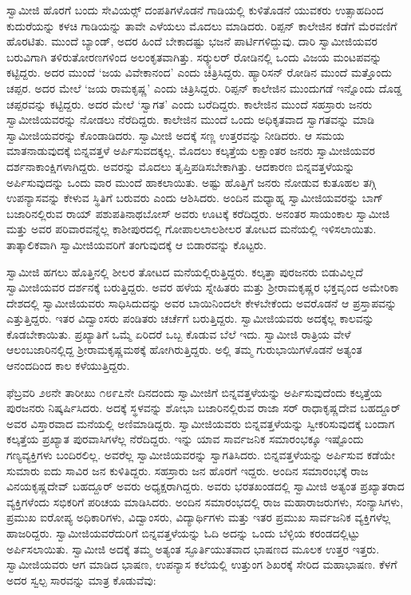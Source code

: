 \vskip 3pt

 ಸ್ವಾಮೀಜಿ ಹೊರಗೆ ಬಂದು ಸೇವಿಯರ್ಸ್‍‍ ದಂಪತಿಗಳೊಡನೆ ಗಾಡಿಯಲ್ಲಿ ಕುಳಿತೊಡನೆ ಯುವಕರು ಉತ್ಸಾಹದಿಂದ ಕುದುರೆಯನ್ನು ಕಳಚಿ ಗಾಡಿಯನ್ನು ತಾವೇ ಎಳೆಯಲು ಮೊದಲು ಮಾಡಿದರು. ರಿಪ್ಪನ್ ಕಾಲೇಜಿನ ಕಡೆಗೆ ಮೆರವಣಿಗೆ ಹೊರಟಿತು. ಮುಂದೆ ಬ್ಯಾಂಡ್, ಅದರ ಹಿಂದೆ ಬೇಕಾದಷ್ಟು ಭಜನೆ ಪಾರ್ಟಿಗಳಿದ್ದುವು. ದಾರಿ ಸ್ವಾಮೀಜಿಯವರ ಬರುವಿಗಾಗಿ ತಳಿರುತೋರಣಗಳಿಂದ ಅಲಂಕೃತವಾಗಿತ್ತು. ಸರ್‍ಕ್ಯುಲರ್ ರೋಡಿನಲ್ಲಿ ಒಂದು ವಿಜಯ ಮಂಟಪವನ್ನು ಕಟ್ಟಿದ್ದರು. ಅದರ ಮುಂದೆ ‘ಜಯ ವಿವೇಕಾನಂದ’ ಎಂದು ಚಿತ್ರಿಸಿದ್ದರು. ಹ್ಯಾರಿಸನ್ ರೋಡಿನ ಮುಂದೆ ಮತ್ತೊಂದು ಚಪ್ಪರ. ಅದರ ಮೇಲೆ ‘ಜಯ ರಾಮಕೃಷ್ಣ’ ಎಂದು ಚಿತ್ರಿಸಿದ್ದರು. ರಿಪ್ಪನ್ ಕಾಲೇಜಿನ ಮುಂದುಗಡೆ ಇನ್ನೊಂದು ದೊಡ್ಡ ಚಪ್ಪರವನ್ನು ಕಟ್ಟಿದ್ದರು. ಅದರ ಮೇಲೆ ‘ಸ್ವಾಗತ’ ಎಂದು ಬರೆದಿದ್ದರು. ಕಾಲೇಜಿನ ಮುಂದೆ ಸಹಸ್ರಾರು ಜನರು ಸ್ವಾಮೀಜಿಯವರನ್ನು ನೋಡಲು ನೆರೆದಿದ್ದರು. ಕಾಲೇಜಿನ ಮುಂದೆ ಒಂದು ಅಧಿಕೃತವಾದ ಸ್ವಾಗತವನ್ನು ಮಾಡಿ ಸ್ವಾಮೀಜಿಯವರನ್ನು ಕೊಂಡಾಡಿದರು. ಸ್ವಾಮೀಜಿ ಅದಕ್ಕೆ ಸಣ್ಣ ಉತ್ತರವನ್ನು ನೀಡಿದರು. ಆ ಸಮಯ ಮಾತನಾಡುವುದಕ್ಕೆ ಬಿನ್ನವತ್ತಳೆ ಅರ್ಪಿಸುವದಕ್ಕಲ್ಲ. ಮೊದಲು ಕಲ್ಕತ್ತೆಯ ಲಕ್ಷಾಂತರ ಜನರು ಸ್ವಾಮೀಜಿಯವರ ದರ್ಶನಾಕಾಂಕ್ಷಿಗಳಾಗಿದ್ದರು. ಅವರನ್ನು ಮೊದಲು ತೃಪ್ತಿಪಡಿಸಬೇಕಾಗಿತ್ತು. ಆದಕಾರಣ ಬಿನ್ನವತ್ತಳೆಯನ್ನು ಅರ್ಪಿಸುವುದನ್ನು ಒಂದು ವಾರ ಮುಂದೆ ಹಾಕಲಾಯಿತು. ಅಷ್ಟು ಹೊತ್ತಿಗೆ ಜನರು ನೋಡುವ ಕುತೂಹಲ ತಗ್ಗಿ ಉಪನ್ಯಾಸವನ್ನು ಕೇಳುವ ಸ್ಥಿತಿಗೆ ಬರುವರು ಎಂದು ಆಶಿಸಿದರು. ಅಂದಿನ ಮಧ್ಯಾಹ್ನ ಸ್ವಾಮೀಜಿಯವರನ್ನು ಬಾಗ್ ಬಜಾರಿನಲ್ಲಿರುವ ರಾಯ್ ಪಶುಪತಿನಾಥಬೋಸ್ ಅವರು ಊಟಕ್ಕೆ ಕರೆದಿದ್ದರು. ಅನಂತರ ಸಾಯಂಕಾಲ ಸ್ವಾಮೀಜಿ ಮತ್ತು ಅವರ ಪರಿವಾರವನ್ನೆಲ್ಲ ಕಾಶೀಪುರದಲ್ಲಿ ಗೋಪಾಲಲಾಲಶೀಲರ ತೋಟದ ಮನೆಯಲ್ಲಿ ಇಳಿಸಲಾಯಿತು. ತಾತ್ಕಾಲಿಕವಾಗಿ ಸ್ವಾಮೀಜಿಯವರಿಗೆ ತಂಗುವುದಕ್ಕೆ ಆ ಬಿಡಾರವನ್ನು ಕೊಟ್ಟರು. 

 ಸ್ವಾಮೀಜಿ ಹಗಲು ಹೊತ್ತಿನಲ್ಲಿ ಶೀಲರ ತೋಟದ ಮನೆಯಲ್ಲಿರುತ್ತಿದ್ದರು. ಕಲ್ಕತ್ತಾ ಪುರಜನರು ಬಿಡುವಿಲ್ಲದೆ ಸ್ವಾಮೀಜಿಯವರ ದರ್ಶನಕ್ಕೆ ಬರುತ್ತಿದ್ದರು. ಅವರ ಹಳೆಯ ಸ್ನೇಹಿತರು ಮತ್ತು ಶ‍್ರೀರಾಮಕೃಷ್ಣರ ಭಕ್ತವೃಂದ ಅಮೇರಿಕಾ ದೇಶದಲ್ಲಿ ಸ್ವಾಮೀಜಿಯವರು ಸಾಧಿಸಿದುದನ್ನು ಅವರ ಬಾಯಿನಿಂದಲೇ ಕೇಳಬೇಕೆಂದು ಅವರೊಡನೆ ಆ ಪ್ರಸ್ತಾಪವನ್ನು ಎತ್ತುತ್ತಿದ್ದರು. ಇತರ ವಿದ್ವಾಂಸರು ಪಂಡಿತರು ಚರ್ಚೆಗೆ ಬರುತ್ತಿದ್ದರು. ಸ್ವಾಮೀಜಿಯವರು ಅದಕ್ಕೆಲ್ಲ ಕಾಲವನ್ನು ಕೊಡಬೇಕಾಯಿತು. ಪ್ರಖ್ಯಾತಿಗೆ ಒಮ್ಮೆ ಏರಿದರೆ ಒಬ್ಬ ಕೊಡುವ ಬೆಲೆ ಇದು. ಸ್ವಾಮೀಜಿ ರಾತ್ರಿಯ ವೇಳೆ ಆಲಂಬಜಾರಿನಲ್ಲಿದ್ದ ಶ‍್ರೀರಾಮಕೃಷ್ಣಮಠಕ್ಕೆ ಹೋಗಿರುತ್ತಿದ್ದರು. ಅಲ್ಲಿ ತಮ್ಮ ಗುರುಭಾಯಿಗಳೊಡನೆ ಅತ್ಯಂತ ಆನಂದದಿಂದ ಕಾಲ ಕಳೆಯುತ್ತಿದ್ದರು. 

 ಫೆಬ್ರವರಿ ೨೮ನೇ ತಾರೀಖು ೧೮೯೭ನೇ ದಿನದಂದು ಸ್ವಾಮೀಜಿಗೆ ಬಿನ್ನವತ್ತಳೆಯನ್ನು ಅರ್ಪಿಸುವುದೆಂದು ಕಲ್ಕತ್ತೆಯ ಪುರಜನರು ನಿಷ್ಕರ್ಷಿಸಿದರು. ಅದಕ್ಕೆ ಸ್ಥಳವನ್ನು ಶೋಭಾ ಬಜಾರಿನಲ್ಲಿರುವ ರಾಜಾ ಸರ್ ರಾಧಾಕೃಷ್ಣದೇವ ಬಹದ್ದೂರ್ ಅವರ ವಿಸ್ತಾರವಾದ ಮನೆಯಲ್ಲಿ ಅಣಿಮಾಡಿದ್ದರು. ಸ್ವಾಮೀಜಿಯವರು ಬಿನ್ನವತ್ತಳೆಯನ್ನು ಸ್ವೀಕರಿಸುವುದಕ್ಕೆ ಬಂದಾಗ ಕಲ್ಕತ್ತೆಯ ಪ್ರಖ್ಯಾತ ಪುರವಾಸಿಗಳೆಲ್ಲ ನೆರೆದಿದ್ದರು. ಇನ್ನು ಯಾವ ಸಾರ್ವಜನಿಕ ಸಮಾರಂಭಕ್ಕೂ ಇಷ್ಟೊಂದು ಗಣ್ಯವ್ಯಕ್ತಿಗಳು ಬಂದಿರಲಿಲ್ಲ. ಅವರೆಲ್ಲ ಸ್ವಾಮೀಜಿಯವರನ್ನು ಸ್ವಾಗತಿಸಿದರು. ಬಿನ್ನವತ್ತಳೆಯನ್ನು ಅರ್ಪಿಸುವ ಕಡೆಯೇ ಸುಮಾರು ಐದು ಸಾವಿರ ಜನ ಕುಳಿತಿದ್ದರು. ಸಹಸ್ರಾರು ಜನ ಹೊರಗೆ ಇದ್ದರು. ಅಂದಿನ ಸಮಾರಂಭಕ್ಕೆ ರಾಜ ವಿನಯಕೃಷ್ಣದೇವ್ ಬಹದ್ದೂರ್ ಅವರು ಅಧ್ಯಕ್ಷರಾಗಿದ್ದರು. ಅವರು ಭರತಖಂಡದಲ್ಲಿ ಸ್ವಾಮೀಜಿ ಅತ್ಯಂತ ಪ್ರಖ್ಯಾತರಾದ ವ್ಯಕ್ತಿಗಳೆಂದು ಸಭಿಕರಿಗೆ ಪರಿಚಯ ಮಾಡಿಸಿದರು. ಅಂದಿನ ಸಮಾರಂಭದಲ್ಲಿ ರಾಜ ಮಹಾರಾಜರುಗಳು, ಸಂನ್ಯಾಸಿಗಳು, ಪ್ರಮುಖ ಐರೋಪ್ಯ ಅಧಿಕಾರಿಗಳು, ವಿದ್ವಾಂಸರು, ವಿದ್ಯಾರ್ಥಿಗಳು ಮತ್ತು ಇತರ ಪ್ರಮುಖ ಸಾರ್ವಜನಿಕ ವ್ಯಕ್ತಿಗಳೆಲ್ಲ ಹಾಜರಿದ್ದರು. ಸ್ವಾಮೀಜಿಯವರೆದುರಿಗೆ ಬಿನ್ನವತ್ತಳೆಯನ್ನು ಓದಿ ಅದನ್ನು ಒಂದು ಬೆಳ್ಳಿಯ ಕರಂಡದಲ್ಲಿಟ್ಟು ಅರ್ಪಿಸಲಾಯಿತು. ಸ್ವಾಮೀಜಿ ಅದಕ್ಕೆ ತಮ್ಮ ಅತ್ಯಂತ ಸ್ಫೂರ್ತಿಯುತವಾದ ಭಾಷಣದ ಮೂಲಕ ಉತ್ತರ ಇತ್ತರು. ಸ್ವಾಮೀಜಿಯವರು ಆಗ ಮಾಡಿದ ಭಾಷಣ, ಉಪನ್ಯಾಸ ಕಲೆಯಲ್ಲಿ ಉತ್ತುಂಗ ಶಿಖರಕ್ಕೆ ಸೇರಿದ ಮಹಾಭಾಷಣ. ಕೆಳಗೆ ಅದರ ಸ್ವಲ್ಪ ಸಾರವನ್ನು ಮಾತ್ರ ಕೊಡುವೆವು: 

